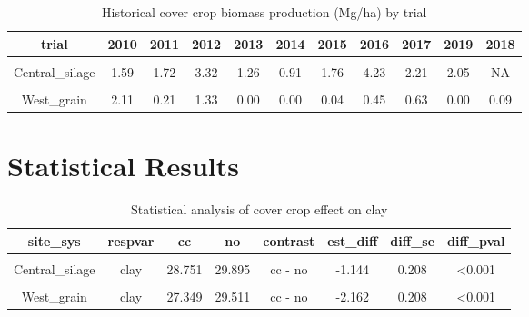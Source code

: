 \documentclass[
]{article}
\begin{document}
\begin{table}[H]

\caption{\label{tab:ccbio}Historical cover crop biomass production (Mg/ha) by trial}
\centering
\begin{tabular}[t]{ccccccccccc}
\toprule
trial & 2010 & 2011 & 2012 & 2013 & 2014 & 2015 & 2016 & 2017 & 2019 & 2018\\
\midrule
\cellcolor{gray!6}{Central\_grain} & \cellcolor{gray!6}{0.86} & \cellcolor{gray!6}{0.28} & \cellcolor{gray!6}{1.37} & \cellcolor{gray!6}{0.25} & \cellcolor{gray!6}{0.47} & \cellcolor{gray!6}{0.61} & \cellcolor{gray!6}{2.22} & \cellcolor{gray!6}{2.76} & \cellcolor{gray!6}{1.29} & \cellcolor{gray!6}{NA}\\
\cmidrule{1-11}
Central\_silage & 1.59 & 1.72 & 3.32 & 1.26 & 0.91 & 1.76 & 4.23 & 2.21 & 2.05 & NA\\
\cmidrule{1-11}
\cellcolor{gray!6}{East\_grain} & \cellcolor{gray!6}{2.11} & \cellcolor{gray!6}{1.46} & \cellcolor{gray!6}{0.00} & \cellcolor{gray!6}{0.92} & \cellcolor{gray!6}{0.00} & \cellcolor{gray!6}{0.36} & \cellcolor{gray!6}{0.51} & \cellcolor{gray!6}{7.30} & \cellcolor{gray!6}{0.30} & \cellcolor{gray!6}{0.19}\\
\cmidrule{1-11}
West\_grain & 2.11 & 0.21 & 1.33 & 0.00 & 0.00 & 0.04 & 0.45 & 0.63 & 0.00 & 0.09\\
\bottomrule
\end{tabular}
\end{table}

\newpage

\hypertarget{statistical-results}{%
\section{Statistical Results}\label{statistical-results}}

\begin{table}[H]

\caption{\label{tab:clay}Statistical analysis of cover crop effect on clay}
\centering
\begin{tabular}[t]{cccccccc}
\toprule
site\_sys & respvar & cc & no & contrast & est\_diff & diff\_se & diff\_pval\\
\midrule
\cellcolor{gray!6}{Central\_grain} & \cellcolor{gray!6}{clay} & \cellcolor{gray!6}{27.740} & \cellcolor{gray!6}{28.000} & \cellcolor{gray!6}{cc - no} & \cellcolor{gray!6}{-0.260} & \cellcolor{gray!6}{0.186} & \cellcolor{gray!6}{0.164}\\
Central\_silage & clay & 28.751 & 29.895 & cc - no & -1.144 & 0.208 & <0.001\\
\cellcolor{gray!6}{East\_grain} & \cellcolor{gray!6}{clay} & \cellcolor{gray!6}{31.730} & \cellcolor{gray!6}{34.606} & \cellcolor{gray!6}{cc - no} & \cellcolor{gray!6}{-2.876} & \cellcolor{gray!6}{0.208} & \cellcolor{gray!6}{<0.001}\\
West\_grain & clay & 27.349 & 29.511 & cc - no & -2.162 & 0.208 & <0.001\\
\bottomrule
\end{tabular}
\end{table}
\end{document}
